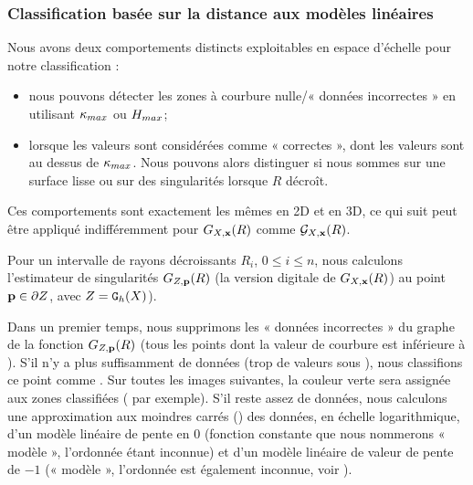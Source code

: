 \subsubsection{Classification basée sur la distance aux modèles linéaires}%
\label{sec:applications:feature:II:classification}
%
Nous avons deux comportements distincts exploitables en espace d'échelle pour
notre classification :
%
\begin{itemize}
   \item nous pouvons détecter les zones à courbure nulle/« données incorrectes » en
         utilisant $\kappa_{max}$ ou $H_{max}$;
   \item lorsque les valeurs sont considérées comme « correctes », \cad dont les valeurs sont au dessus de
         $\kappa_{max}$. Nous pouvons alors distinguer si nous sommes sur une surface
         lisse ou sur des singularités lorsque $R$ décroît.
\end{itemize}
%
Ces comportements sont exactement les mêmes en 2D et en 3D, ce qui suit peut
être appliqué indifféremment pour $G_{X,\mathbf{x}}(R)$ comme $\mathcal{G}_{X,\mathbf{x}}(R)$.


Pour un intervalle de rayons décroissants $R_i$, $0 \leq i \leq n$, nous
calculons l'estimateur de singularités $G_{Z,\mathbf{p}}(R)$ (la version
digitale de $G_{X,\mathbf{x}}(R)$) au point $\mathbf{p} \in \partial Z$, avec $Z = \mathtt{G}_{h}(X)$).


Dans un premier temps, nous supprimons les « données incorrectes » du graphe de
la fonction $G_{Z,\mathbf{p}}(R)$ (\cad tous les points dont la valeur de courbure est
inférieure à \CurvMax). S'il n'y a plus suffisamment de données (trop de valeurs
sous \CurvMax), nous classifions ce point comme \featflat. Sur toutes les images
suivantes, la couleur verte sera assignée aux zones classifiées \featflat
( par exemple). S'il reste assez de données, nous
calculons une approximation aux moindres carrés ()
des données, en échelle logarithmique, d'un modèle linéaire de pente en $0$
(fonction constante que nous nommerons « modèle \featsmooth », l'ordonnée étant
inconnue) et d'un modèle linéaire de valeur de pente de $-1$ (« modèle \featedge »,
l'ordonnée est également inconnue, voir
).


